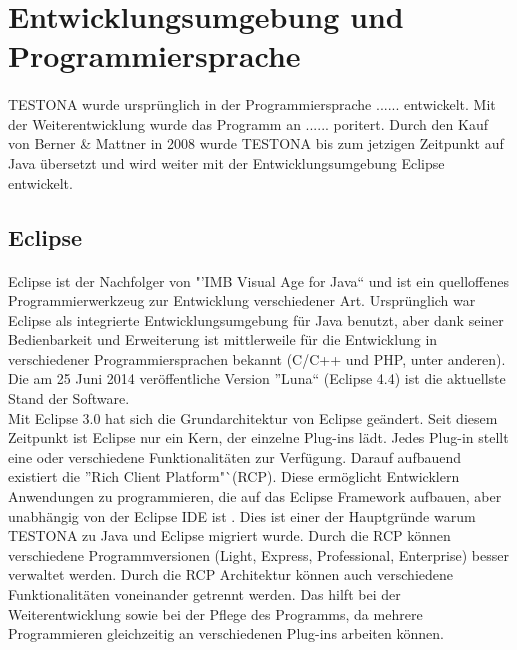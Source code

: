 \section{Entwicklungsumgebung und Programmiersprache}
\paragraph{}
TESTONA wurde ursprünglich in der Programmiersprache ...... entwickelt. Mit der Weiterentwicklung wurde das Programm an ...... poritert. Durch den Kauf von Berner \& Mattner in 2008 wurde TESTONA bis zum jetzigen Zeitpunkt auf Java übersetzt und wird weiter mit der Entwicklungsumgebung Eclipse entwickelt.

\subsection{Eclipse}
\paragraph{}
Eclipse ist der Nachfolger von "'IMB Visual Age for Java"` und ist ein quelloffenes Programmierwerkzeug zur Entwicklung verschiedener Art. Ursprünglich war Eclipse als integrierte Entwicklungsumgebung für Java benutzt, aber dank seiner Bedienbarkeit und Erweiterung ist mittlerweile für die Entwicklung in verschiedener Programmiersprachen bekannt (C/C++ und PHP, unter anderen). Die am 25 Juni 2014 veröffentliche Version "'Luna"` (Eclipse 4.4) ist die aktuellste Stand der Software. \\

Mit Eclipse 3.0 hat sich die Grundarchitektur von Eclipse geändert. Seit diesem Zeitpunkt ist Eclipse nur ein Kern, der einzelne Plug-ins lädt. Jedes Plug-in stellt eine oder verschiedene Funktionalitäten zur Verfügung. Darauf aufbauend existiert die "'Rich Client Platform"`(RCP). Diese ermöglicht Entwicklern Anwendungen zu programmieren, die auf das Eclipse Framework aufbauen, aber unabhängig von der Eclipse IDE ist\cite{EclipseRCP} \cite{Eclipse}. Dies ist einer der Hauptgründe warum TESTONA zu Java und Eclipse migriert wurde. Durch die RCP können verschiedene Programmversionen (Light, Express, Professional, Enterprise) besser verwaltet werden. Durch die RCP Architektur können auch verschiedene Funktionalitäten voneinander getrennt werden. Das hilft bei der Weiterentwicklung sowie bei der Pflege des Programms, da mehrere Programmieren gleichzeitig an verschiedenen Plug-ins arbeiten können.\\



